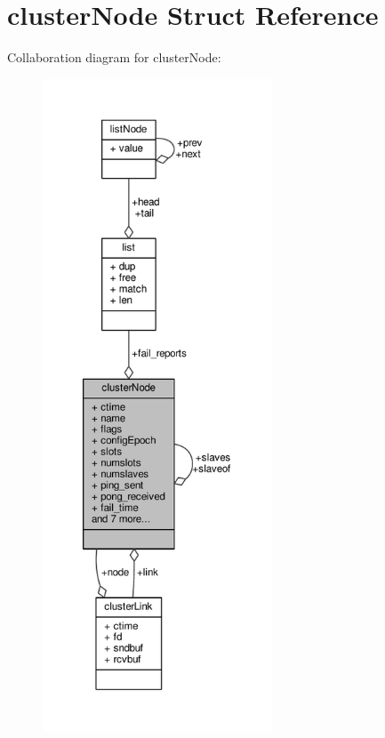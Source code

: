 \hypertarget{structclusterNode}{}\section{cluster\+Node Struct Reference}
\label{structclusterNode}


Collaboration diagram for cluster\+Node\+:\nopagebreak
\begin{figure}[H]
\begin{center}
\leavevmode
\includegraphics[height=550pt]{structclusterNode__coll__graph}
\end{center}
\end{figure}
